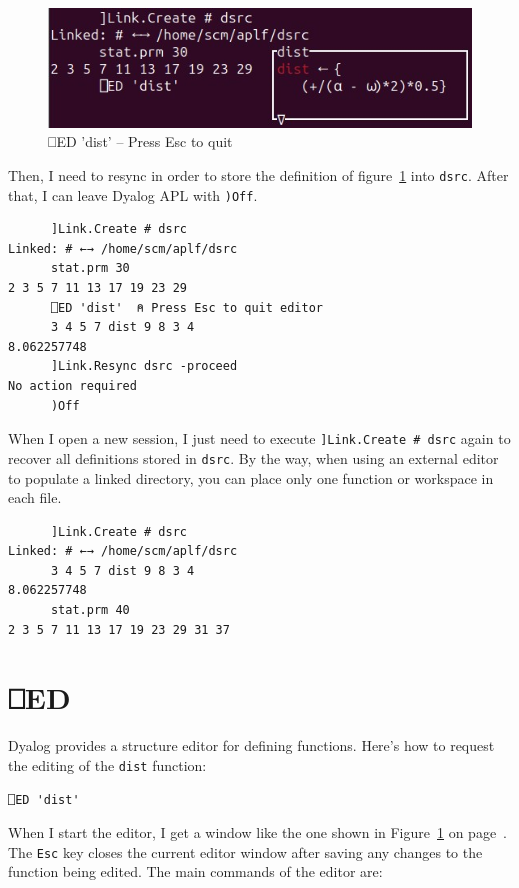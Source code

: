 \documentclass[a4paper,12pt]{book}
\begin{document}
\begin{figure}[!t]
\includegraphics{srcfigs/edwindow.jpg}
\caption{⎕ED 'dist' -- Press Esc to quit}
  \label{srcfigs/edwindow.jpg}
\end{figure}
Then, I need to resync in order to store
the definition of figure~\ref{srcfigs/edwindow.jpg}
into \verb|dsrc|.
After that, I can leave Dyalog APL with \verb|)Off|.
\begin{verbatim}
      ]Link.Create # dsrc                                           
Linked: # ←→ /home/scm/aplf/dsrc                                    
      stat.prm 30                                                   
2 3 5 7 11 13 17 19 23 29                                           
      ⎕ED 'dist'  ⍝ Press Esc to quit editor                         
      3 4 5 7 dist 9 8 3 4
8.062257748
      ]Link.Resync dsrc -proceed
No action required
      )Off
\end{verbatim}
When I open a new session,
I just need to execute \verb|]Link.Create # dsrc| again
to recover all definitions stored in \verb|dsrc|.
By the way, when using an external editor
to populate a linked directory, you can place
only one function or workspace in each file.
\begin{verbatim}
      ]Link.Create # dsrc
Linked: # ←→ /home/scm/aplf/dsrc
      3 4 5 7 dist 9 8 3 4
8.062257748
      stat.prm 40
2 3 5 7 11 13 17 19 23 29 31 37
\end{verbatim}

\section{⎕ED}
Dyalog provides a structure editor for
defining functions. Here's how to request
the editing of the \verb|dist| function:
\begin{verbatim}
⎕ED 'dist' 
\end{verbatim}
When I start the editor, I get a window like
the one shown in Figure~\ref{srcfigs/edwindow.jpg}
on page~\pageref{srcfigs/edwindow.jpg}.
The \verb|Esc| key closes the current editor
window after saving any changes to the function
being edited. The main commands of the editor are:
\end{document}

